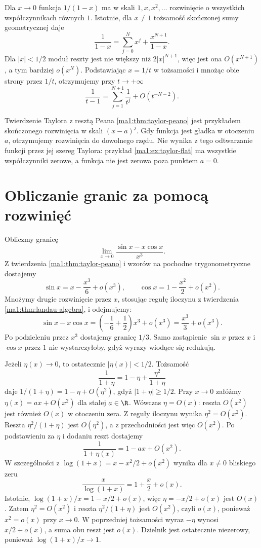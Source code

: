 \begin{przyklad}
\label{ma1:ex:asymptotic-geometric}
Dla $x\to0$ funkcja $1/(1-x)$ ma w skali $1,x,x^2,\ldots$ rozwinięcie o wszystkich współczynnikach równych $1$. Istotnie, dla $x\ne1$ tożsamość skończonej sumy geometrycznej daje
\[
 \frac1{1-x}=\sum_{j=0}^N x^j+\frac{x^{N+1}}{1-x}.
\]
Dla $|x|<1/2$ moduł reszty jest nie większy niż $2|x|^{N+1}$, więc jest ona $O(x^{N+1})$, a tym bardziej $o(x^N)$. Podstawiając $x=1/t$ w tożsamości i mnożąc obie strony przez $1/t$, otrzymujemy przy $t\to+\infty$
\[
 \frac1{t-1}=\sum_{j=1}^{N+1}\frac1{t^j}+O(t^{-N-2}).
\]
\end{przyklad}
Twierdzenie Taylora z resztą Peana \ref{ma1:thm:taylor-peano} jest przykładem skończonego rozwinięcia w skali $(x-a)^j$. Gdy funkcja jest gładka w otoczeniu $a$, otrzymujemy rozwinięcia do dowolnego rzędu. Nie wynika z tego odtwarzanie funkcji przez jej szereg Taylora: przykład \ref{ma1:ex:taylor-flat} ma wszystkie współczynniki zerowe, a funkcja nie jest zerowa poza punktem $a=0$.

\section{Obliczanie granic za pomocą rozwinięć}
\begin{przyklad}
\label{ma1:ex:asymptotic-cancel-taylor}
Obliczmy granicę
\[
 \lim_{x\to0}\frac{\sin x-x\cos x}{x^3}.
\]
Z twierdzenia \ref{ma1:thm:taylor-peano} i wzorów na pochodne trygonometryczne dostajemy
\[
 \sin x=x-\frac{x^3}{6}+o(x^3),\qquad
 \cos x=1-\frac{x^2}{2}+o(x^2).
\]
Mnożymy drugie rozwinięcie przez $x$, stosując regułę iloczynu z twierdzenia \ref{ma1:thm:landau-algebra}, i odejmujemy:
\[
 \sin x-x\cos x
 =\left(-\frac16+\frac12\right)x^3+o(x^3)
 =\frac{x^3}{3}+o(x^3).
\]
Po podzieleniu przez $x^3$ dostajemy granicę $1/3$. Samo zastąpienie $\sin x$ przez $x$ i $\cos x$ przez $1$ nie wystarczyłoby, gdyż wyrazy wiodące się redukują.
\end{przyklad}

\begin{przyklad}
\label{ma1:ex:asymptotic-reciprocal}
Jeżeli $\eta(x)\to0$, to ostatecznie $|\eta(x)|<1/2$. Tożsamość
\[
 \frac1{1+\eta}=1-\eta+\frac{\eta^2}{1+\eta}
\]
daje $1/(1+\eta)=1-\eta+O(\eta^2)$, gdyż $|1+\eta|\ge1/2$. Przy $x\to0$ załóżmy $\eta(x)=ax+O(x^2)$ dla stałej $a\in\R$. Wówczas $\eta=O(x)$: reszta $O(x^2)$ jest również $O(x)$ w otoczeniu zera. Z reguły iloczynu wynika $\eta^2=O(x^2)$. Reszta $\eta^2/(1+\eta)$ jest $O(\eta^2)$, a z przechodniości jest więc $O(x^2)$. Po podstawieniu za $\eta$ i dodaniu reszt dostajemy
\[
 \frac1{1+\eta(x)}=1-ax+O(x^2).
\]
W szczególności z $\log(1+x)=x-x^2/2+o(x^2)$ wynika dla $x\ne0$ bliskiego zeru
\[
 \frac{x}{\log(1+x)}=1+\frac{x}{2}+o(x).
\]
Istotnie, $\log(1+x)/x=1-x/2+o(x)$, więc $\eta=-x/2+o(x)$ jest $O(x)$. Zatem $\eta^2=O(x^2)$ i reszta $\eta^2/(1+\eta)$ jest $O(x^2)$, czyli $o(x)$, ponieważ $x^2=o(x)$ przy $x\to0$. W poprzedniej tożsamości wyraz $-\eta$ wynosi $x/2+o(x)$, a suma obu reszt jest $o(x)$. Dzielnik jest ostatecznie niezerowy, ponieważ $\log(1+x)/x\to1$.
\end{przyklad}
